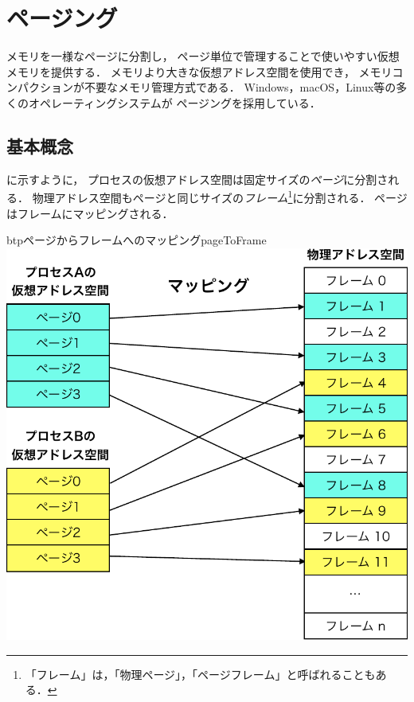 \chapter{ページング}
\label{chap:paging}
% 
メモリを一様なページに分割し，
ページ単位で管理することで使いやすい仮想メモリを提供する．
メモリより大きな仮想アドレス空間を使用でき，
メモリコンパクションが不要なメモリ管理方式である．
Windows，macOS，Linux等の多くのオペレーティングシステムが
ページングを採用している．

\section{基本概念}
に示すように，
プロセスの仮想アドレス空間は固定サイズの\emph{ページ}に分割される．
物理アドレス空間もページと同じサイズの\emph{フレーム}\footnote{
  「フレーム」は，「物理ページ」，「ページフレーム」と呼ばれることもある．
}に分割される．
ページはフレームにマッピングされる．

\begin{myfig}{btp}{ページからフレームへのマッピング}{pageToFrame}
  \includegraphics[scale=0.66]{Fig/pageToFrame-crop.pdf}
\end{myfig}

